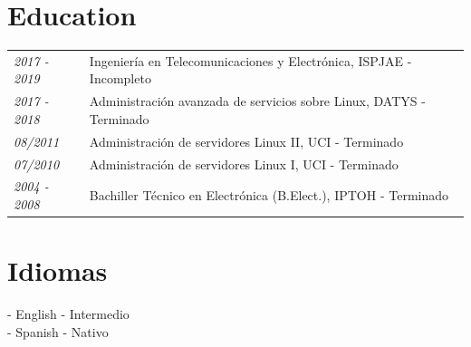 \documentclass[a4paper,12pt]{article}
\begin{document}
\section{Education}
\begin{tabular}{p{3cm}| p{15cm}}
	\emph{2017 - 2019}  &Ingenier\'ia en Telecomunicaciones y Electrónica, ISPJAE - Incompleto \\
	\emph{2017 - 2018}  & Administraci\'on avanzada de servicios sobre Linux, DATYS - Terminado \\
	\emph{08/2011}  & Administraci\'on de servidores Linux II, UCI - Terminado \\
	\emph{07/2010}  & Administraci\'on de servidores Linux I, UCI - Terminado \\
	\emph{2004 - 2008}  & Bachiller T\'ecnico en Electr\'onica (B.Elect.), IPTOH - Terminado \\
\end{tabular}

\section{Idiomas}
\justify
- English - Intermedio\\
- Spanish - Nativo


\end{document}

